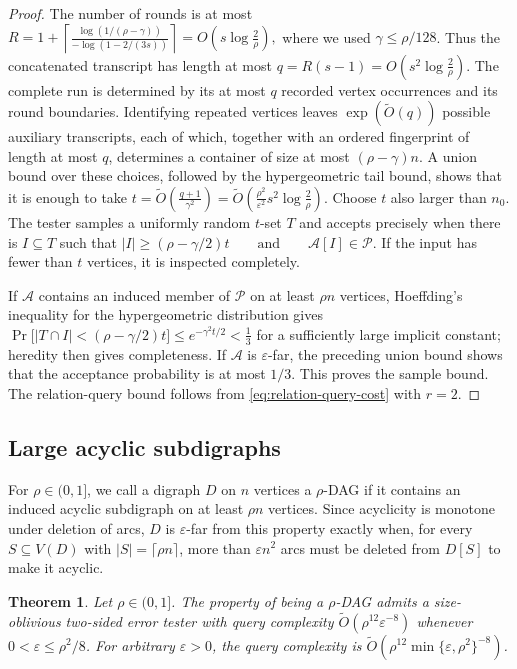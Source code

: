 \documentclass[11pt,reqno,letterpaper]{amsart}
\newcommand{\cA}{{\mathcal A}}
\newcommand{\cP}{{\mathcal P}}
\theoremstyle{plain}
\newtheorem{thm}{Theorem}[section]
\theoremstyle{remark}
\begin{document}
\begin{proof}
The number of rounds is at most
\(R= 1+\left\lceil \frac{\log(1/(\rho-\gamma))}{-\log(1-2/(3s))} \right\rceil =O\!\left(s\log\frac2\rho\right),\)
where we used $\gamma\leq\rho/128$.  Thus the concatenated transcript has
length at most
\(q=R(s-1)=O\!\left(s^2\log\frac2\rho\right).\)
The complete run is determined by its at most $q$ recorded vertex
occurrences and its round boundaries.  Identifying repeated vertices leaves
$\exp(\widetilde O(q))$ possible auxiliary transcripts, each of which, together
with an ordered fingerprint of length at most $q$, determines a container of
size at most $(\rho-\gamma)n$.  A union bound over these choices, followed by
the hypergeometric tail bound, shows that it is enough to take
\(t=\widetilde O\!\left(\frac{q+1}{\gamma^2}\right)
 =\widetilde O\!\left(\frac{\rho^2}{\varepsilon^2}s^2\log\frac2\rho\right).\)
Choose $t$ also larger than $n_0$.
The tester samples a uniformly random $t$-set $T$ and accepts precisely when
there is $I\subseteq T$ such that
\(|I|\geq(\rho-\gamma/2)t \qquad\text{and}\qquad \cA[I]\in\cP.\)
If the input has fewer than $t$ vertices, it is inspected completely.

If $\cA$ contains an induced member of $\cP$ on at least $\rho n$ vertices,
Hoeffding's inequality for the hypergeometric distribution gives
\(\Pr\bigl[|T\cap I|<(\rho-\gamma/2)t\bigr] \leq e^{-\gamma^2t/2}<\frac13\)
for a sufficiently large implicit constant; heredity then gives completeness.
If $\cA$ is $\varepsilon$-far, the preceding union bound shows that the
acceptance probability is at most $1/3$.  This proves the sample bound.  The
relation-query bound follows from \eqref{eq:relation-query-cost} with $r=2$.
\end{proof}

\subsection{Large acyclic subdigraphs}

For $\rho\in(0,1]$, we call a digraph $D$ on $n$ vertices a
$\rho$-DAG if it contains an induced acyclic subdigraph on at least $\rho n$
vertices.  Since acyclicity is monotone under deletion of arcs, $D$ is
$\varepsilon$-far from this property exactly when, for every
$S\subseteq V(D)$ with $|S|=\lceil\rho n\rceil$, more than
$\varepsilon n^2$ arcs must be deleted from $D[S]$ to make it acyclic.

\begin{thm}\label{thm:rho-DAG}
Let $\rho\in(0,1]$.  The property of being a $\rho$-DAG admits a size-oblivious two-sided error tester with query complexity
\(\widetilde O\!\left(\rho^{12}\varepsilon^{-8}\right)
\)
whenever $0<\varepsilon\leq\rho^2/8$.  For arbitrary $\varepsilon>0$, the query complexity is
\(\widetilde O\!\left(
\rho^{12}\min\{\varepsilon,\rho^2\}^{-8}
\right)\).
\end{thm}
\end{document}
